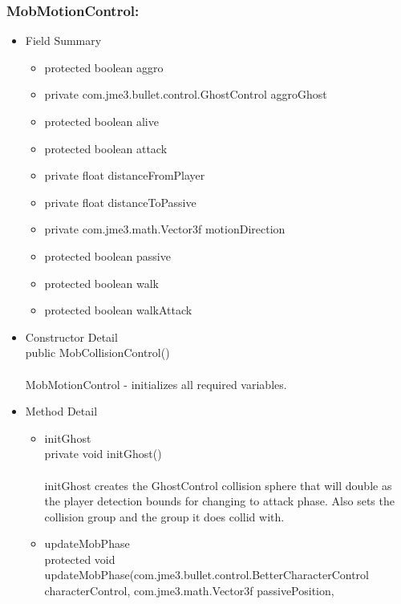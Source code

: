\documentclass[letterpaper]{article}
\begin{document}
								\subsubsection*{MobMotionControl:}
								\vspace{0.1in}	
									\begin{itemize}
										\item	Field Summary
												\begin{itemize}
													\item	protected boolean	aggro 
													\item	private com.jme3.bullet.control.GhostControl	aggroGhost 
													\item	protected boolean	alive 
													\item	protected boolean	attack 
													\item	private float	distanceFromPlayer 
													\item	private float	distanceToPassive 
													\item	private com.jme3.math.Vector3f	motionDirection 
													\item	protected boolean	passive 
													\item	protected boolean	walk 
													\item	protected boolean	walkAttack  
												\end{itemize}
										\item	Constructor Detail \\
												public MobCollisionControl() \\ \\ 
												MobMotionControl - initializes all required variables. \\
										\item	Method Detail
												\begin{itemize}
													\item	initGhost \\
															private void initGhost() \\ \\
															initGhost creates the GhostControl collision sphere that will double as the player detection bounds for changing to attack phase. Also sets the collision group and the group it does collid with.
													\item	updateMobPhase \\
															protected void updateMobPhase(com.jme3.bullet.control.BetterCharacterControl \\ characterControl, com.jme3.math.Vector3f passivePosition, \\

\end{itemize}
\end{itemize}
\end{document}

